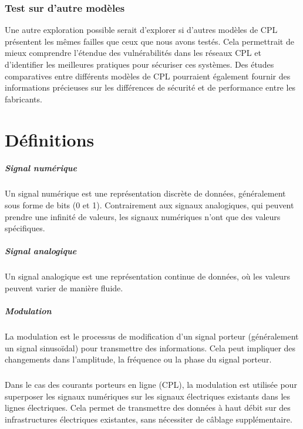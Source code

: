 \documentclass[a4paper,twocolumn]{report}
\begin{document}
\subsection{Test sur d'autre modèles}Une autre exploration possible serait d'explorer si d'autres modèles de CPL
présentent les mêmes failles que ceux que nous avons testés. Cela permettrait de
mieux comprendre l'étendue des vulnérabilités dans les réseaux CPL et d'identifier
les meilleures pratiques pour sécuriser ces systèmes. Des études comparatives entre
différents modèles de CPL pourraient également fournir des informations précieuses
sur les différences de sécurité et de performance entre les fabricants.

\appendix
\chapter{Définitions}
\paragraph{Signal numérique} Un signal numérique est une représentation discrète
de données, généralement sous forme de bits (0 et 1). Contrairement aux signaux analogiques,
qui peuvent prendre une infinité de valeurs, les signaux numériques n'ont que des valeurs spécifiques.
\paragraph{Signal analogique} Un signal analogique est une représentation continue de données,
où les valeurs peuvent varier de manière fluide.
\paragraph{Modulation} La modulation est le processus de modification d'un signal porteur
(généralement un signal sinusoïdal) pour transmettre des informations.
Cela peut impliquer des changements dans l'amplitude, la fréquence ou la phase du signal porteur.



\paragraph{}Dans le cas des courants porteurs en ligne (CPL), la modulation est utilisée
pour superposer les signaux numériques sur les signaux électriques existants dans les lignes électriques.
Cela permet de transmettre des données à haut débit sur des infrastructures électriques existantes,
sans nécessiter de câblage supplémentaire.
\end{document}
